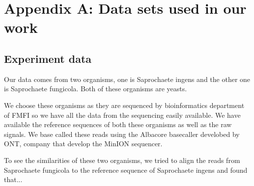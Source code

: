 \chapter*{Appendix A: Data sets used in our work}

\section{Experiment data}

Our data comes from two organisms, one is Saprochaete ingens and the other one is
Saprochaete fungicola. Both of these organisms are yeasts.

We choose these organisms as they are sequenced by bioinformatics department of
FMFI so we have all the data from the sequencing easily available.
We have available the reference sequences of both these organisms as well as the
raw signals. We base called these reads using the Albacore basecaller develobed by
ONT, company that develop the MinION sequencer.

To see the similarities of these two organisms, we tried to align the reads from
Saprochaete fungicola to the reference sequence of Saprochaete ingens and found
that...

